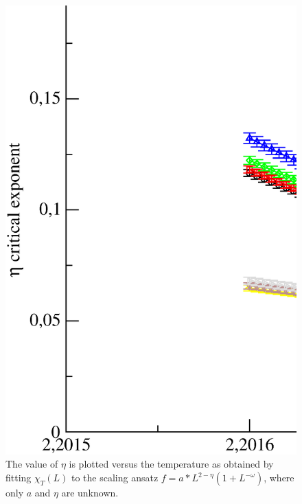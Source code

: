 \begin{figure}[!htpb]
  \centering
  \includegraphics[width=\textwidth]{./plots/3DXY/vsT/eta.eps}
  \caption{The value of $\eta$ is plotted versus the temperature as obtained by fitting $\chi_T(L)$ to the scaling ansatz $f = a*L^{2-\eta}(1+L^{-\omega})$, where only $a$ and $\eta$ are unknown.  }
\end{figure}




